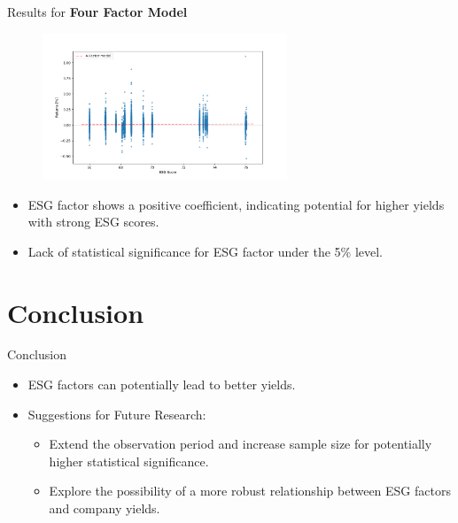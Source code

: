 \documentclass{beamer}
\begin{document}
\begin{frame}{Results for \textbf{Four Factor Model}}
  \begin{figure}
    \includegraphics[width=0.65\textwidth]{../figures/regression.png}
    \centering
  \end{figure}
      \begin{itemize}
        \item ESG factor shows a positive coefficient, indicating potential for higher yields with strong ESG scores.
        \item Lack of statistical significance for ESG factor under the 5\% level.
      \end{itemize}
\end{frame}

\section{Conclusion}
\begin{frame}{Conclusion}
  \begin{itemize}
    \item ESG factors can potentially lead to better yields.
\item Suggestions for Future Research:
      \begin{itemize}
        \item Extend the observation period and increase sample size for potentially higher statistical significance.
        \item Explore the possibility of a more robust relationship between ESG factors and company yields.
        \end{itemize}
  \end{itemize}
\end{frame}
\end{document}
